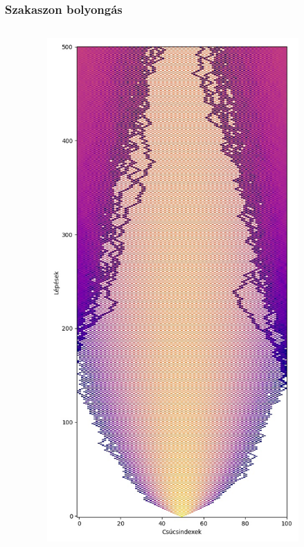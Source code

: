 \documentclass[aspectratio=169]{beamer}
\begin{document}
\begin{frame}
  \frametitle{Szakaszon bolyongás}

  \begin{columns}[onlytextwidth]
    \begin{column}{.25\textwidth}
    \end{column}
    \begin{column}{.25\textwidth}
      \begin{figure}
        \includegraphics[width=0.9\textwidth]{./figures/classical_simulation_long.jpg}

\end{figure}
\end{column}
\end{columns}
\end{frame}
\end{document}
